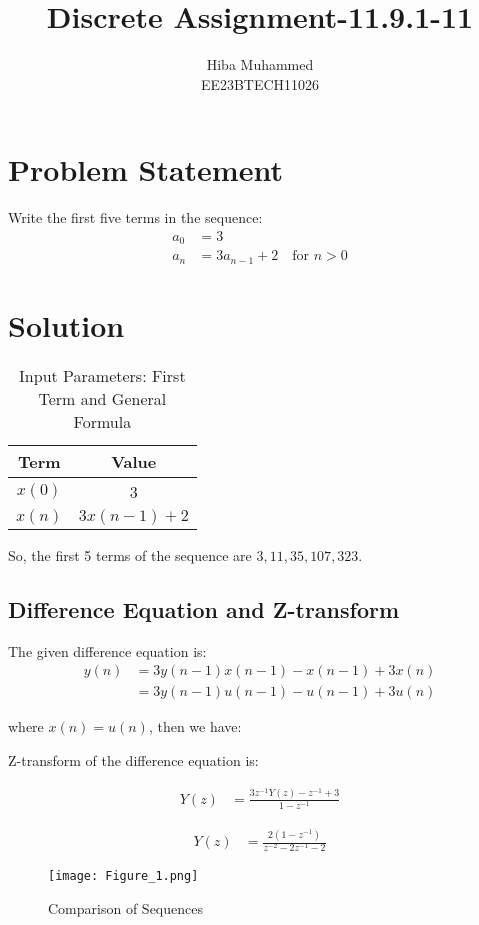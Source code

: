 \documentclass[12pt]{article}
\title{Discrete Assignment-11.9.1-11}
\author{Hiba Muhammed \\
        EE23BTECH11026}
\date{}
\begin{document}
\maketitle

\section*{Problem Statement}
Write the first five terms in the sequence:
\begin{align}
a_{0}  &= 3 \\
a_{n}  &= 3a_{n-1} + 2 \quad \text{for } n > 0
\end{align}

\section*{Solution}
\begin{table}[h]
  \centering
  \caption{Input Parameters: First Term and General Formula}
  \begin{tabular}{|c|c|}
    \hline
    \textbf{Term} & \textbf{Value} \\
    \hline
    \(x(0)\) & 3 \\
    \(x(n)\) & \(3x(n-1) + 2\) \\
    \hline
  \end{tabular}
\end{table}


So, the first 5 terms of the sequence are \(3, 11, 35, 107, 323\).

\subsection*{Difference Equation and Z-transform}

The given difference equation is:
\begin{align*}
y(n) &= 3y(n-1)x(n-1) - x(n-1) + 3x(n) \\
     &= 3y(n-1)u(n-1) - u(n-1) + 3u(n)
\end{align*}

where \( x(n) = u(n) \), then we have:



Z-transform of the difference equation is:

\begin{align*}
Y(z) &= \frac{3z^{-1}Y(z) - z^{-1} + 3}{1 - z^{-1}}
\end{align*}


\begin{align*}
Y(z) &= \frac{2(1 - z^{-1})}{z^{-2} - 2z^{-1} - 2}
\end{align*}

\begin{figure}[h]
    \centering
    \texttt{[image: Figure\_1.png]}
    \caption{Comparison of Sequences}
    \label{fig:comparison}
\end{figure}
\end{document}
